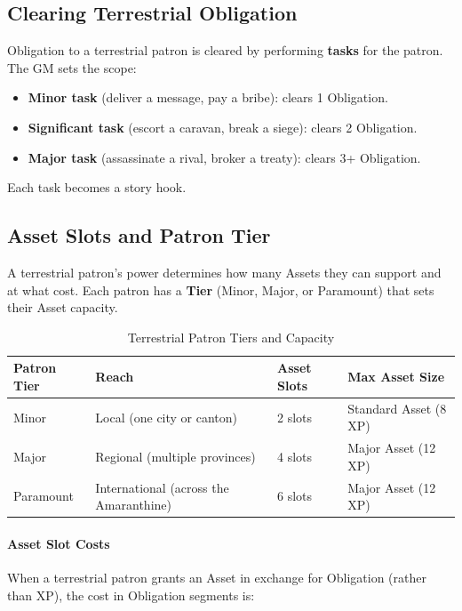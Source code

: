 \subsection{Clearing Terrestrial Obligation}

Obligation to a terrestrial patron is cleared by performing \textbf{tasks} for the patron. The GM sets the scope:
\begin{itemize}
  \item \textbf{Minor task} (deliver a message, pay a bribe): clears 1 Obligation.
  \item \textbf{Significant task} (escort a caravan, break a siege): clears 2 Obligation.
  \item \textbf{Major task} (assassinate a rival, broker a treaty): clears 3+ Obligation.
\end{itemize}
Each task becomes a story hook.

\subsection{Asset Slots and Patron Tier}

A terrestrial patron's power determines how many Assets they can support and at what cost. Each patron has a \textbf{Tier} (Minor, Major, or Paramount) that sets their Asset capacity.

\begin{table}[htbp]
\centering
\small
\begin{tabularx}{\linewidth}{lXXX}
\toprule
\textbf{Patron Tier} & \textbf{Reach} & \textbf{Asset Slots} & \textbf{Max Asset Size} \\
\midrule
Minor & Local (one city or canton) & 2 slots & Standard Asset (8 XP) \\
Major & Regional (multiple provinces) & 4 slots & Major Asset (12 XP) \\
Paramount & International (across the Amaranthine) & 6 slots & Major Asset (12 XP) \\
\bottomrule
\end{tabularx}
\caption{Terrestrial Patron Tiers and Capacity}
\label{tab:patron-tiers}
\end{table}

\paragraph{Asset Slot Costs}
When a terrestrial patron grants an Asset in exchange for Obligation (rather than XP), the cost in Obligation segments is:

